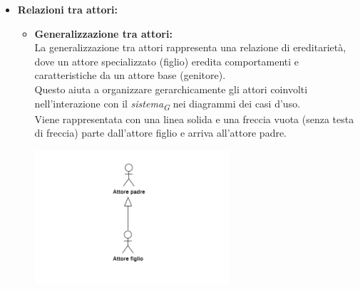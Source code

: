 \begin{itemize}
    \item \textbf{Relazioni tra attori:}
    \begin{itemize}
        \item \textbf{Generalizzazione tra attori:} \\
        La generalizzazione tra attori rappresenta una relazione di ereditarietà, dove un attore specializzato (figlio) eredita comportamenti e caratteristiche da un attore base (genitore). \\
        Questo aiuta a organizzare gerarchicamente gli attori coinvolti nell'interazione con il \textit{sistema}\textsubscript{\textit{G}} nei diagrammi dei casi d'uso. \\
        Viene rappresentata con una linea solida e una freccia vuota (senza testa di freccia) parte dall'attore figlio e arriva all'attore padre.
        \begin{minipage}[t]{\linewidth}
            \centering
            \includegraphics[width=0.6\textwidth]{../Images/NormeDiProgetto/GeneralizzazioneAttori.PNG}
        \end{minipage}
    \end{itemize}
    

\end{itemize}
